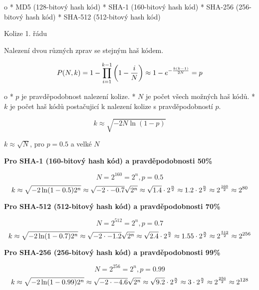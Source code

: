 \begitems \style o
* MD5 (128-bitový hash kód)
* SHA-1 (160-bitový hash kód)
* SHA-256 (256-bitový hash kód)
* SHA-512 (512-bitový hash kód)
\enditems



\sec Kolize 1. řádu

Nalezení dvou různých zprav se stejným haš kódem.

$$
P(N,k) = 1 - \prod^{k-1}_{i=1}\left( 1 - {i \over N} \right)
\approx 1 - e^{-{k(k-1) \over 2N}}= p
$$

\begitems \style o
* $p$ je pravděpodobnost nalezení kolize.
* $N$ je počet všech možných haš kódů.
* $k$ je počet haš kódů postačujicí k nalezení kolize s pravděpodobností $p$.
\enditems

$$k \approx \sqrt{-2N\ln(1 - p)}$$
\centerline
{$k \approx \sqrt{N}$, pro $p = 0.5$ a velké $N$}

\bigskip\centerline
{\bf Pro SHA-1 (160-bitový hash kód) a pravděpodobnosti 50\%}

$$N = 2^{160} = 2^n, p = 0.5$$
$$
k \approx \sqrt{-2 \ln(1 - 0.5) 2^n} \approx \sqrt{-2 \cdot -0.7}\sqrt{2^n}
\approx \sqrt{1.4} \cdot 2^{n \over 2} \approx 1.2 \cdot 2^{n \over 2}
\approx 2^{160 \over 2} \approx 2^{80}
$$

\bigskip\centerline
{\bf Pro SHA-512 (512-bitový hash kód) a pravděpodobnosti 70\%}

$$N = 2^{512} = 2^n, p = 0.7$$
$$
k \approx \sqrt{-2 \ln(1 - 0.7) 2^n} \approx \sqrt{-2 \cdot -1.2}\sqrt{2^n}
\approx \sqrt{2.4} \cdot 2^{n \over 2} \approx 1.55 \cdot 2^{n \over 2}
\approx 2^{512 \over 2} \approx 2^{256}
$$

\bigskip\centerline
{\bf Pro SHA-256 (256-bitový hash kód) a pravděpodobnosti 99\%}

$$N = 2^{256} = 2^n, p = 0.99$$
$$
k \approx \sqrt{-2 \ln(1 - 0.99) 2^n} \approx \sqrt{-2 \cdot -4.6}\sqrt{2^n}
\approx \sqrt{9.2} \cdot 2^{n \over 2} \approx 3 \cdot 2^{n \over 2}
\approx 2^{256 \over 2} \approx 2^{128}
$$

